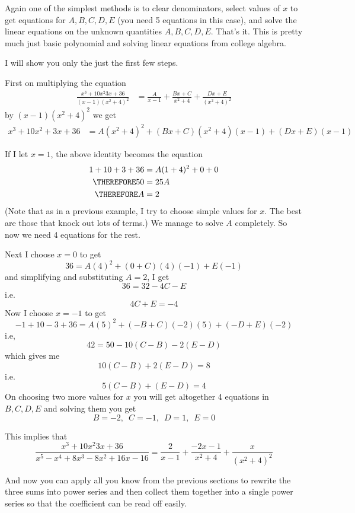 Again one of the simplest methods is to clear denominators,
select values of $x$ to get equations for $A, B, C, D, E$ 
(you need 5 equations in this case), and solve
the linear equations on the unknown quantities $A, B, C, D, E$.
That's it.
This is pretty much just basic polynomial and solving
linear equations from college algebra.

I will show you only the just the first few steps.

First on multiplying the equation
\begin{align*}
\frac{x^3 + 10x^2  3x + 36}{(x - 1)(x^2 + 4)^2}
&=
\frac{A}{x - 1} +
\frac{Bx + C}{x^2 + 4} + \frac{Dx + E}{(x^2 + 4)^2}
\end{align*}
by $(x - 1)(x^2 + 4)^2$ we get
\begin{align*}
x^3 + 10x^2 + 3x + 36
&=
A(x^2 + 4)^2 +
(Bx + C)(x^2 + 4)(x - 1) +
(Dx + E)(x-1)
\end{align*}

If I let $x = 1$, the above identity becomes the equation
\begin{align*}
1 + 10 + 3 + 36 &= A(1 + 4)^2 + 0 + 0 \\
\THEREFORE 50 &= 25A \\
\THEREFORE A &= 2
\end{align*}
(Note that as in a previous example, I try to choose
simple values for $x$. The best are those that knock out lots
of terms.)
We manage to solve $A$ completely.
So now we need 4 equations for the rest.

Next I choose $x = 0$ to get
\[
36 = A(4)^2 + (0 + C)(4)(-1) + E(-1)
\]
and simplifying and substituting $A = 2$, I get
\[
36 =  32 - 4C - E
\]
i.e.
\[
4C + E = -4
\]
Now I choose $x = -1$ to get
\[
-1 + 10 - 3 + 36 = A(5)^2 + (-B+C)(-2)(5) + (-D+E)(-2)
\]
i.e,
\[
42 = 50 -10(C - B) -2(E - D)
\]
which gives me
\[
10(C - B) + 2(E - D) = 8
\]
i.e.
\[
5(C - B) + (E - D) = 4
\]
On choosing two more values for $x$ you will get
altogether 4 equations in $B, C, D, E$
and solving them you get
\[
B = -2, \,\,\,
C = -1, \,\,\,
D = 1, \,\,\,
E = 0
\]

This implies that
\[
\frac{x^3 + 10x^2  3x + 36}{x^5 - x^4 + 8x^3 - 8x^2 + 16x - 16}
=
\frac{2}{x - 1} +
\frac{-2x -1}{x^2 + 4} + \frac{x}{(x^2 + 4)^2} 
\]

And now you can apply all you know from the previous sections
to rewrite the three sums into power series and then
collect them together into a single power series so that
the coefficient can be read off easily.

